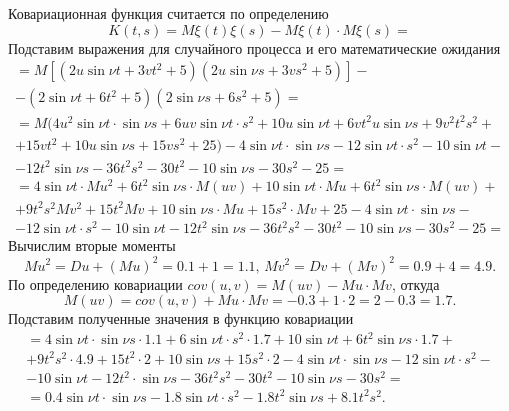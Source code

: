 Ковариационная функция считается по определению
$$K \left( t, s \right) =
  M \xi \left( t \right) \xi \left( s \right) -
    M \xi \left( t \right) \cdot M \xi \left( s \right) =$$
Подставим выражения для случайного процесса и его математические ожидания
\begin{equation*}
  \begin{split}
    = M \left[
      \left( 2u \sin \nu t + 3vt^2 + 5 \right) \left( 2u \sin \nu s + 3vs^2 + 5 \right) \right] - \\
    - \left( 2 \sin \nu t + 6t^2 + 5 \right) \left( 2 \sin \nu s + 6s^2 + 5 \right) = \\
    = M(4u^2 \sin \nu t \cdot \sin \nu s + 6uv \sin \nu t \cdot s^2 + 10u \sin \nu t +
      6vt^2 u \sin \nu s + 9v^2 t^2 s^2 + \\
      + 15vt^2 + 10u \sin \nu s + 15vs^2 + 25) -
    4 \sin \nu t \cdot \sin \nu s - 12 \sin \nu t \cdot s^2 - 10 \sin \nu t - \\
    - 12t^2 \sin \nu s - 36t^2 s^2 - 30t^2 - 10 \sin \nu s - 30s^2 - 25 = \\
    = 4 \sin \nu t \cdot Mu^2 + 6t^2 \sin \nu s \cdot M \left( uv \right) + 10 \sin \nu t \cdot Mu +
    6t^2 \sin \nu s \cdot M \left( uv \right) + \\
    + 9t^2 s^2 Mv^2 + 15t^2 Mv + 10 \sin \nu s \cdot Mu + 15s^2 \cdot Mv + 25 -
    4 \sin \nu t \cdot \sin \nu s - \\
    - 12 \sin \nu t \cdot s^2 - 10 \sin \nu t - 12t^2 \sin \nu s - 36t^2 s^2 - 30t^2 -
    10 \sin \nu s - 30s^2 - 25 =
  \end{split}
\end{equation*}
Вычислим вторые моменты
$$Mu^2 = Du + \left( Mu \right)^2 = 0.1 + 1 = 1.1, \,
  Mv^2 = Dv + \left( Mv \right)^2 = 0.9 + 4 = 4.9.$$
По определению ковариации $cov \left( u, v \right) = M \left( uv \right) - Mu \cdot Mv$,
откуда
$$M \left( uv \right) =
  cov \left( u, v \right) + Mu \cdot Mv =
  -0.3 + 1 \cdot 2 =
  2 - 0.3 =
  1.7.$$
Подставим полученные значения в функцию ковариации
\begin{equation*}
  \begin{split}
    = 4 \sin \nu t \cdot \sin \nu s \cdot 1.1 + 6 \sin \nu t \cdot s^2 \cdot 1.7 + 10 \sin \nu t +
    6t^2 \sin \nu s \cdot 1.7 + \\
    + 9t^2 s^2 \cdot 4.9 + 15t^2 \cdot 2 + 10 \sin \nu s + 15s^2 \cdot 2 -
    4 \sin \nu t \cdot \sin \nu s - 12 \sin \nu t \cdot s^2 - \\
    - 10 \sin \nu t - 12t^2 \cdot \sin \nu s - 36t^2 s^2 - 30t^2 - 10 \sin \nu s - 30s^2 = \\
    = 0.4 \sin \nu t \cdot \sin \nu s - 1.8 \sin \nu t \cdot s^2 - 1.8t^2 \sin \nu s + 8.1t^2 s^2.
  \end{split}
\end{equation*}

